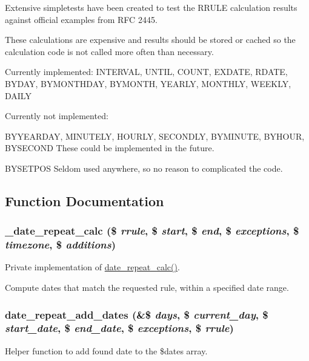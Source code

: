 Extensive simpletests have been created to test the RRULE calculation results against official examples from RFC 2445.

These calculations are expensive and results should be stored or cached so the calculation code is not called more often than necessary.

Currently implemented: INTERVAL, UNTIL, COUNT, EXDATE, RDATE, BYDAY, BYMONTHDAY, BYMONTH, YEARLY, MONTHLY, WEEKLY, DAILY

Currently not implemented:

BYYEARDAY, MINUTELY, HOURLY, SECONDLY, BYMINUTE, BYHOUR, BYSECOND These could be implemented in the future.

BYSETPOS Seldom used anywhere, so no reason to complicated the code. 

\subsection{Function Documentation}
\hypertarget{date__repeat__calc_8inc_ad796c923ad9e24f33935e46db723e0d5}{
\subsubsection[{\_\-date\_\-repeat\_\-calc}]{\setlength{\rightskip}{0pt plus 5cm}\_\-date\_\-repeat\_\-calc (\$ {\em rrule}, \/  \$ {\em start}, \/  \$ {\em end}, \/  \$ {\em exceptions}, \/  \$ {\em timezone}, \/  \$ {\em additions})}}
\label{date__repeat__calc_8inc_ad796c923ad9e24f33935e46db723e0d5}
Private implementation of \hyperlink{date__repeat_8module_a3d79ef2b99159e6f7bf47560e0fd40f9}{date\_\-repeat\_\-calc()}.

Compute dates that match the requested rule, within a specified date range. \hypertarget{date__repeat__calc_8inc_a046e6888825942f799c920fd836ac093}{
\subsubsection[{date\_\-repeat\_\-add\_\-dates}]{\setlength{\rightskip}{0pt plus 5cm}date\_\-repeat\_\-add\_\-dates (\&\$ {\em days}, \/  \$ {\em current\_\-day}, \/  \$ {\em start\_\-date}, \/  \$ {\em end\_\-date}, \/  \$ {\em exceptions}, \/  \$ {\em rrule})}}
\label{date__repeat__calc_8inc_a046e6888825942f799c920fd836ac093}
Helper function to add found date to the \$dates array.

